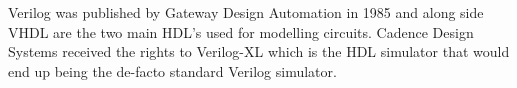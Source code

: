 \documentclass[a4paper]{report}
\begin{document}
Verilog was published by Gateway Design Automation in 1985 and along side VHDL are the two main HDL's used for modelling circuits. Cadence Design Systems received the rights to Verilog-XL which is the HDL simulator that would end up being the de-facto standard Verilog simulator.


%
\end{document}
